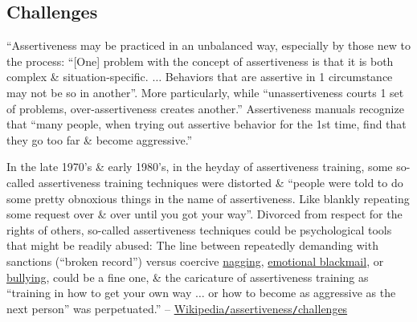 \documentclass[oneside]{book}
\numberwithin{equation}{section}
\begin{document}
\subsection{Challenges}
``Assertiveness may be practiced in an unbalanced way, especially by  those new to the process: ``[One] problem with the concept of assertiveness is that it is both complex \& situation-specific. $\ldots$ Behaviors that are assertive in 1 circumstance may not be so in another''. More particularly, while ``unassertiveness courts 1 set of problems, over-assertiveness creates another.'' Assertiveness manuals recognize that ``many people, when trying out assertive behavior for the 1st time, find that they go too far \& become aggressive.''

In the late 1970's \& early 1980's, in the heyday of assertiveness training, some so-called assertiveness training techniques were distorted \& ``people were told to do some pretty obnoxious things in the name of assertiveness. Like blankly repeating some request over \& over until you got your way''. Divorced from respect for the rights of others, so-called assertiveness techniques could be psychological tools that might be readily abused: The line between repeatedly demanding with sanctions (``broken record'') versus coercive \href{https://en.wikipedia.org/wiki/Nagging}{nagging}, \href{https://en.wikipedia.org/wiki/Emotional_blackmail}{emotional blackmail}, or \href{https://en.wikipedia.org/wiki/Bullying}{bullying}, could be a fine one, \& the caricature of assertiveness training as ``training in how to get your own way $\ldots$ or how to become as aggressive as the next person'' was perpetuated.'' -- \href{https://en.wikipedia.org/wiki/Assertiveness#Challenges}{Wikipedia\texttt{/}assertiveness\texttt{/}challenges}

\end{document}
